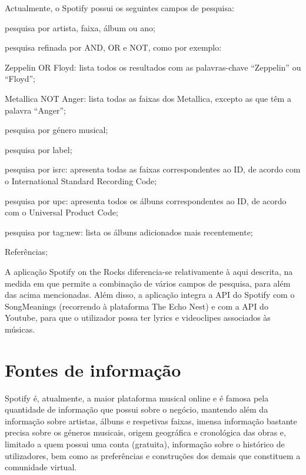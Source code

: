 \documentclass[twocolumn,twoside,11pt,a4paper]{article}
\begin{document}
Actualmente, o Spotify possui os seguintes campos de pesquisa:
\begin{compactitem}
  \item pesquisa por artista, faixa, álbum ou ano;
  \item pesquisa refinada por AND, OR e NOT, como por exemplo:
    \begin{compactitem}
      \item Zeppelin OR Floyd: lista todos os resultados com as palavras-chave “Zeppelin” ou “Floyd”;
      \item Metallica NOT Anger: lista todas as faixas dos Metallica, excepto as que têm a palavra “Anger”;
    \end{compactitem}
  \item pesquisa por género musical;
  \item pesquisa por label;
  \item pesquisa por isrc: apresenta todas as faixas correspondentes ao ID, de acordo com o International Standard Recording Code;
  \item pesquisa por upc: apresenta todos os álbuns correspondentes ao ID, de acordo com o Universal Product Code;
  \item pesquisa por tag:new: lista os álbuns adicionados mais recentemente;
  \item Referências;
\end{compactitem}


A aplicação Spotify on the Rocks diferencia-se relativamente à aqui descrita, na medida
em que permite a combinação de vários campos de pesquisa, para além das acima mencionadas.
Além disso, a aplicação integra a API do Spotify com o SongMeanings (recorrendo à plataforma
 The Echo Nest) e com a API do Youtube, para que o utilizador possa ter lyrics e videoclipes
associados às músicas.



\section{Fontes de informação}\label{sec:sources}

Spotify é, atualmente, a maior plataforma musical online e é famosa pela quantidade de
informação que possui sobre o negócio, mantendo além da informação sobre artistas, álbuns
e respetivas faixas, imensa informação bastante precisa sobre os géneros musicais, origem
geográfica e cronológica das obras e, limitado a quem possui uma conta (gratuita), informação
sobre o histórico de utilizadores, bem como as preferências e construções dos demais que
constituem a comunidade virtual.
\end{document}
